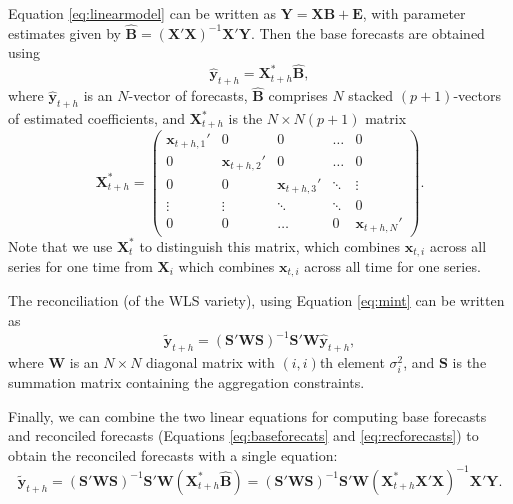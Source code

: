 \documentclass[11pt,a4paper,]{article}
\begin{document}
Equation \eqref{eq:linearmodel} can be written as \(\bm{Y} = \bm{X} \bm{B} + \bm{E}\), with parameter estimates given by \(\hat{\bm{B}} = (\bm{X}'\bm{X})^{-1} \bm{X}'\bm{Y}\). Then the base forecasts are obtained using
\begin{equation}\label{eq:baseforecats}
\hat{\bm{y}}_{t+h} = \bm{X}_{t+h}^* \hat{\bm{B}},
\end{equation}
where \(\hat{\bm{y}}_{t+h}\) is an \(N\)-vector of forecasts, \(\hat{\bm{B}}\) comprises \(N\) stacked \((p+1)\)-vectors of estimated coefficients, and \(\bm{X}_{t+h}^*\) is the \(N\times N(p+1)\) matrix
\pagebreak[3]\begin{equation}
\bm{X}_{t+h}^* =
\begin{pmatrix}
\bm{x}_{t+h,1}' & 0                & 0                & \dots  & 0\\
0               & \bm{x}_{t+h,2}' & 0                & \dots  & 0\\
0               & 0                & \bm{x}_{t+h,3}' & \ddots & \vdots \\
\vdots          & \vdots           & \ddots           & \ddots & 0\\
0               & 0                & \dots            & 0      & \bm{x}_{t+h,N}'
\end{pmatrix}.
\end{equation}
Note that we use \(\bm{X}^*_{t}\) to distinguish this matrix, which combines \(\bm{x}_{t,i}\) across all series for one time from \(\bm{X}_i\) which combines \(\bm{x}_{t,i}\) across all time for one series.

The reconciliation (of the WLS variety), using Equation \eqref{eq:mint} can be written as
\begin{equation}\label{eq:recforecasts}
\tilde{\bm{y}}_{t+h} = (\bm{S}'\bm{W}\bm{S})^{-1}\bm{S}'\bm{W}\hat{\bm{y}}_{t+h},
\end{equation}
where \(\bm{W}\) is an \(N\times N\) diagonal matrix with \((i,i)\)th element \(\sigma_i^2\), and \(\bm{S}\) is the summation matrix containing the aggregation constraints.

Finally, we can combine the two linear equations for computing base forecasts and reconciled forecasts (Equations \eqref{eq:baseforecats} and \eqref{eq:recforecasts}) to obtain the reconciled forecasts with a single equation:
\begin{equation}\label{eq:singlestep}
\tilde{\bm{y}}_{t+h} = (\bm{S}'\bm{W}\bm{S})^{-1}\bm{S}'\bm{W}
                        (\bm{X}_{t+h}^* \hat{\bm{B}})
                        = (\bm{S}'\bm{W}\bm{S})^{-1}\bm{S}'\bm{W}
                        (\bm{X}_{t+h}^* \bm{X}'\bm{X})^{-1} \bm{X}'\bm{Y}.
\end{equation}
\end{document}
